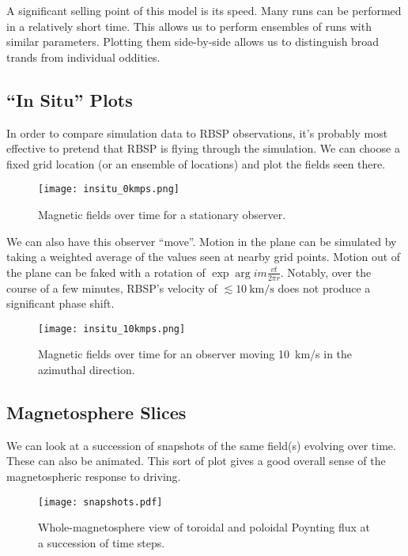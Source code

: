 \documentclass{article}
\begin{document}
A significant selling point of this model is its speed. Many runs can be performed in a relatively short time. This allows us to perform ensembles of runs with similar parameters. Plotting them side-by-side allows us to distinguish broad trands from individual oddities. 

\subsection{``In Situ'' Plots}

In order to compare simulation data to RBSP observations, it's probably most effective to pretend that RBSP is flying through the simulation. We can choose a fixed grid location (or an ensemble of locations) and plot the fields seen there. 
\begin{figure}[H]
  \texttt{[image: insitu\_0kmps.png]}
  \caption{Magnetic fields over time for a stationary observer. }
\end{figure}

We can also have this observer ``move''. Motion in the plane can be simulated by taking a weighted average of the values seen at nearby grid points. Motion out of the plane can be faked with a rotation of $\exp \arg{ i m \frac{v t}{2 \pi r} }$. Notably, over the course of a few minutes, RBSP's velocity of $\lesssim \SI{10}{\km/\s}$ does not produce a significant phase shift. 
\begin{figure}[H]
  \texttt{[image: insitu\_10kmps.png]}
  \caption{Magnetic fields over time for an observer moving \SI{10}{\km/\s} in the azimuthal direction. }
\end{figure}

\subsection{Magnetosphere Slices}

We can look at a succession of snapshots of the same field(s) evolving over time. These can also be animated. This sort of plot gives a good overall sense of the magnetospheric response to driving. 
\begin{figure}[H]
  \texttt{[image: snapshots.pdf]}
  \caption{Whole-magnetosphere view of toroidal and poloidal Poynting flux at a succession of time steps. }
\end{figure}
\end{document}
